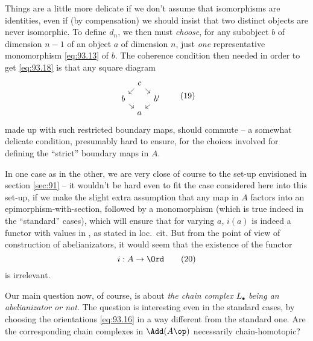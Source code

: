 Things are a little more delicate if we don't assume that isomorphisms
are identities, even if (by compensation) we should insist that two
distinct objects are never isomorphic. To define $d_n$, we then must
\emph{choose}, for any subobject $b$ of dimension $n-1$ of an object
$a$ of dimension $n$, just \emph{one} representative monomorphism
\eqref{eq:93.13} of $b$. The coherence condition then needed in order
to get \eqref{eq:93.18} is that any square diagram
\begin{equation}
  \label{eq:93.19}
  \begin{tikzcd}[sep=tiny]
    & c\ar[dl]\ar[dr] & \\
    b\ar[dr] && b'\ar[dl] \\
    & a &
  \end{tikzcd}
  \tag{19}
\end{equation}
made up with such restricted boundary maps, should commute -- a
somewhat delicate condition, presumably hard to ensure, for the
choices involved for defining the ``strict'' boundary maps in $A$.

In one case as in the other, we are very close of course to the set-up
envisioned in section \ref{sec:91} -- it wouldn't be hard even to fit
the case considered here into this set-up, if we make the slight extra
assumption that any map in $A$ factors into an
epimorphism-with-section, followed by a monomorphism (which is true
indeed in the ``standard'' cases), which will ensure that for varying
$a$, $i(a)$ is indeed a functor with values in \Ord, as stated in
loc.\ cit. But from the point of view of construction of
abelianizators, it would seem that the existence of the functor
\begin{equation}
  \label{eq:93.20}
  i:A\to\Ord\tag{20}
\end{equation}
is irrelevant.

Our main question now, of course, is about \emph{the chain complex
  $L_\bullet$ being an abelianizator or not}. The question is
interesting even in the standard cases, by choosing the orientations
\eqref{eq:93.16} in a way different from the standard one. Are the
corresponding chain complexes in $\Add(A\op)$ necessarily
chain-homotopic?

